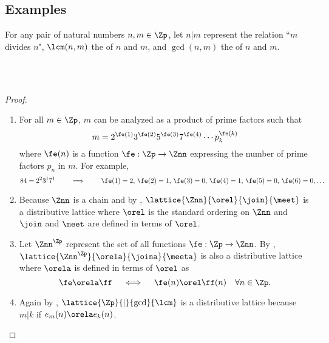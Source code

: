 \subsection{Examples}
\begin{minipage}{\tw-26mm}%
\begin{example}
\label{ex:lat_235_distrib}
\footnotemark
For any pair of natural numbers $n,m\in\Zp$,
let $n|m$ represent the relation ``$m$ divides $n$",
$\lcm(n,m)$ the  of $n$ and $m$, and
$\gcd(n,m)$ the  of $n$ and $m$.
\end{example}%
\end{minipage}%
%
\hfill{}\hfill\mbox{}\\%
\\
\begin{proof}
\begin{enumerate}
  \item For all $m\in\Zp$, $m$ can be analyzed as a product of prime factors such that
    \[ m = 2^{\fe(1)} 3^{\fe(2)} 5^{\fe(3)} 7^{\fe(4)} \cdots p_k^{\fe(k)} \]
    where $\fe(n)$ is a function $\fe:\Zp\to\Znn$ expressing the number of prime factors $p_n$
    in $m$.
    For example,
      \[ 84 = 2^2 3^1 7^1 \qquad\implies\qquad \fe(1)=2,\, \fe(2)=1,\, \fe(3)=0,\, \fe(4)=1,\, \fe(5)=0,\, \fe(6)=0,\ldots \]

  \item Because $\Znn$ is a chain and by ,
        $\lattice{\Znn}{\orel}{\join}{\meet}$ is a distributive lattice
        where $\orel$ is the standard ordering on $\Znn$ and $\join$ and $\meet$ are defined
        in terms of $\orel$.

  \item Let $\Znn^\Zp$ represent the set of all functions $\fe:\Zp\to\Znn$.
        By , $\lattice{\Znn^\Zp}{\orela}{\joina}{\meeta}$
        is also a distributive lattice where $\orela$ is defined in terms of $\orel$ as
        \[ \fe\orela\ff \quad\iff\quad \fe(n)\orel\ff(n) \quad \forall n\in\Zp. \]

  \item Again by ,
        $\lattice{\Zp}{|}{\gcd}{\lcm}$ is a distributive lattice
        because $m|k$ if $e_m(n) \orela e_k(n)$.
\end{enumerate}
\end{proof}




